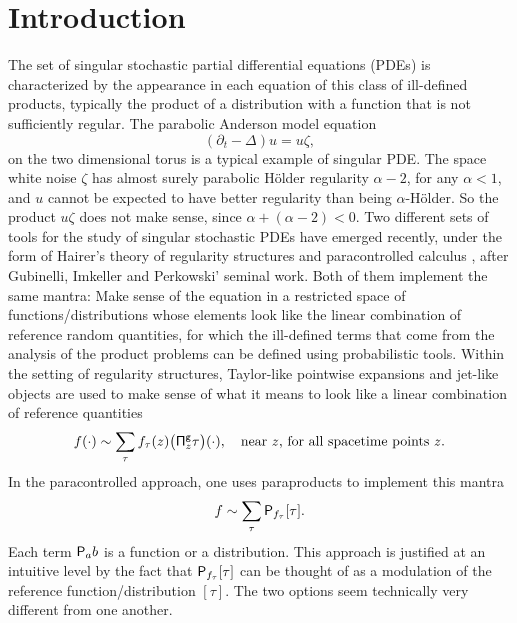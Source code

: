 \documentclass[JEP,XML,SOM,Unicode,published]{cedram}
\theoremstyle{plain}
\theoremstyle{definition}
\begin{document}
\maketitle
\tableofcontents


\section{Introduction}
\label{SectionIntro}

The set of singular stochastic partial differential equations (PDEs) is characterized by the appearance in each equation of this class of ill-defined products, typically the product of a distribution with a function that is not sufficiently regular. The parabolic Anderson model equation
\[
(\partial_t-\Delta) u = u\zeta,
\]
on the two dimensional torus is a typical example of singular PDE. The space white noise $\zeta$ has almost surely parabolic Hölder regularity $\alpha-2$, for any $\alpha<1$, and $u$ cannot be expected to have better regularity than being $\alpha$-Hölder. So the product $u\zeta$ does not make sense, since $\alpha+(\alpha-2)<0$. Two different sets of tools for the study of singular stochastic PDEs have emerged recently, under the form of Hairer's theory of regularity structures \cite{Hai, BHZ, CH16, BCCH18} and paracontrolled calculus \cite{GIP, BBF15, BB16}, after Gubinelli, Imkeller and Perkowski' seminal work. Both of them implement the same mantra: Make sense of the equation in a restricted space of functions/distributions whose elements look like the linear combination of reference random quantities, for which the ill-defined terms that come from the analysis of the product problems can be defined using probabilistic tools. Within the setting of regularity structures, Taylor-like pointwise expansions and jet-like objects are used to make sense of what it means to look like a linear combination of reference quantities
\[
f (\cdot) \sim \sum_\tau f_\tau(z)\bigl({\sf \Pi}^{\sf g}_z\tau\bigr)(\cdot), \quad \textrm{near $z$, for all spacetime points $z$}.
\]
In the paracontrolled approach, one uses paraproducts to implement this mantra
\[
f \sim \sum_\tau {\sf P}_{f_\tau}[\tau].
\]
Each term ${\sf P}_ab$ is a function or a distribution. This approach is justified at an intuitive level by the fact that ${\sf P}_{f_\tau}[\tau]$ can be thought of as a modulation of the reference function/distribution $[\tau]$. The two options seem technically very different from one another.
\end{document}
